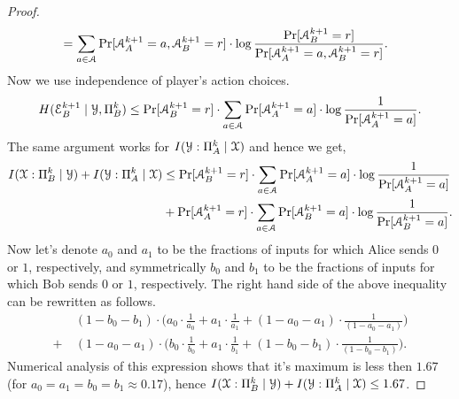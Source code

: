 \begin{proof}
\begin{align*}
	&= \sum_{a\in \mathcal{A}} 
	\Pr[\mathcal{A}^{k+1}_A = a , \mathcal{A}^{k+1}_B = r]\cdot \log 
	\frac{\Pr[\mathcal{A}^{k+1}_B = r]}{\Pr[\mathcal{A}^{k+1}_A = a , \mathcal{A}^{k+1}_B = r]}.
	\end{align*}
	Now we use independence of player's action choices.
	\begin{equation*}\label{eq:common-entropy-bound}
	H(\mathcal{E}^{k+1}_B\mid\mathcal{Y},\Pi^k_B)
	\le \Pr[\mathcal{A}^{k+1}_B = r] \cdot \sum_{a\in \mathcal{A}} 
	\Pr[\mathcal{A}^{k+1}_A = a] \cdot \log 
	\frac{1}{\Pr[\mathcal{A}^{k+1}_A = a]}.
	\end{equation*}
	The same argument works for $I(\mathcal{Y}:\Pi_A^k\mid\mathcal{X})$ and hence we get,
	\begin{align*}
	I(\mathcal{X}:\Pi_B^k\mid\mathcal{Y}) + I(\mathcal{Y}:\Pi_A^k\mid\mathcal{X})&\leq	
	\Pr[\mathcal{A}^{k+1}_B = r] \cdot \sum_{a\in \mathcal{A}} 
	\Pr[\mathcal{A}^{k+1}_A = a] \cdot \log 
	\frac{1}{\Pr[\mathcal{A}^{k+1}_A = a]} \\
	&+ 
	\Pr[\mathcal{A}^{k+1}_A = r] \cdot
	\sum_{a\in \mathcal{A}} 
	\Pr[\mathcal{A}^{k+1}_B = a] \cdot \log 
	\frac{1}{\Pr[\mathcal{A}^{k+1}_B = a]}.
	\end{align*}
	Now let's denote $a_0$ and $a_1$ to be the fractions of inputs for which Alice sends $0$ or $1$, respectively,
	and symmetrically $b_0$ and $b_1$ to be the fractions of inputs for which Bob sends $0$ or $1$, respectively.
	The right hand side of the above inequality can be rewritten as follows.
	\begin{align*}
	&(1 - b_0 - b_1) \cdot \Biggl( a_0\cdot\frac{1}{a_0} + a_1\cdot\frac{1}{a_1} + (1 - a_0 - a_1)\cdot\frac{1}{(1 - a_0 - a_1)} \Biggr)\\
	+\ &(1 - a_0 - a_1) \cdot \Biggl( b_0\cdot\frac{1}{b_0} + a_1\cdot\frac{1}{b_1} + (1 - b_0 - b_1)\cdot\frac{1}{(1 - b_0 - b_1)}\Biggr).
	\end{align*}
	Numerical analysis of this expression shows that it's maximum is less then $1.67$ (for $a_0 = a_1= b_0 = b_1 \approx 0.17$), hence $I(\mathcal{X}:\Pi_B^k\mid\mathcal{Y}) + I(\mathcal{Y}:\Pi_A^k\mid\mathcal{X})\leq 1.67$.
\end{proof}


